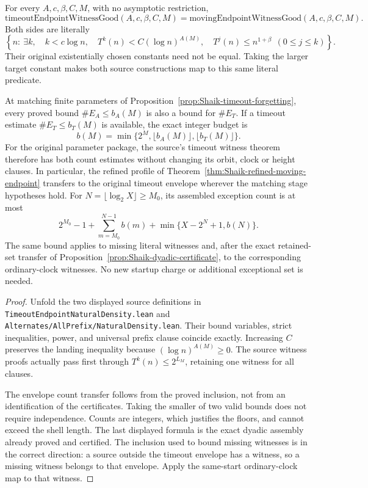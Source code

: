 \begin{corollary}
\label{cor:Shaik-identical-endpoint-witness}
For every \(A,c,\beta,C,M\), with no asymptotic restriction,
\begin{equation}\label{eq:Shaik-literal-witness-equality}
 \mathrm{timeoutEndpointWitnessGood}(A,c,\beta,C,M)
 =
 \mathrm{movingEndpointWitnessGood}(A,c,\beta,C,M).
\end{equation}
Both sides are literally
\[
 \left\{n:\ \exists k,\quad
 k<c\log n,\quad T^k(n)<C(\log n)^{A(M)},\quad
 T^j(n)\le n^{1+\beta}\ \ (0\le j\le k)\right\}.
\]
Their original existentially chosen constants need not be equal.
Taking the larger target constant makes both source constructions map
to this same literal predicate.

At matching finite parameters of Proposition~\ref{prop:Shaik-timeout-forgetting},
every proved bound \(\#E_A\le b_A(M)\) is also a bound for \(\#E_T\).
If a timeout estimate \(\#E_T\le b_T(M)\) is available, the exact
integer budget is
\[
 b(M)=\min\{2^M,\lfloor b_A(M)\rfloor,\lfloor b_T(M)\rfloor\}.
\]
For the original parameter package, the source's timeout witness theorem
therefore has both count estimates without changing its orbit, clock or
height clauses. In particular, the refined profile of
Theorem~\ref{thm:Shaik-refined-moving-endpoint} transfers to the original
timeout envelope wherever the matching stage hypotheses hold.
For \(N=\lfloor\log_2X\rfloor\ge M_0\), its assembled exception count is
at most
\[
 2^{M_0}-1+\sum_{m=M_0}^{N-1}b(m)+
                   \min\{X-2^N+1,b(N)\}.
\]
The same bound applies to missing literal witnesses and, after the exact
retained-set transfer of Proposition~\ref{prop:Shaik-dyadic-certificate},
to the corresponding ordinary-clock witnesses. No new startup charge
or additional exceptional set is needed.
\end{corollary}
\begin{proof}
Unfold the two displayed source definitions in
\texttt{TimeoutEndpointNaturalDensity.lean} and
\texttt{Alternates/AllPrefix/NaturalDensity.lean}. Their bound variables,
strict inequalities, power, and universal prefix clause coincide exactly.
Increasing \(C\) preserves the landing inequality because
\((\log n)^{A(M)}\ge0\). The source witness proofs actually pass first
through \(T^k(n)\le2^{L_M}\), retaining one witness for all clauses.

The envelope count transfer follows from the proved inclusion, not from
an identification of the certificates. Taking the smaller of two valid
bounds does not require independence. Counts are integers, which justifies
the floors, and cannot exceed the shell length. The last displayed formula
is the exact dyadic assembly already proved and certified. The inclusion
used to bound missing witnesses is in the correct direction: a source outside
the timeout envelope has a witness, so a missing witness belongs to that
envelope. Apply the same-start ordinary-clock map to that witness.
\end{proof}

